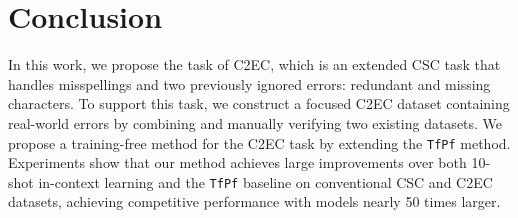 \section{Conclusion}
In this work, we propose the task of C2EC, which is an extended CSC task that handles misspellings and two previously ignored errors: redundant and missing characters.
To support this task, we construct a focused C2EC dataset containing real-world errors by combining and manually verifying two existing datasets.
We propose a training-free method for the C2EC task by extending the \texttt{TfPf} method.
Experiments show that our method achieves large improvements over both 10-shot in-context learning and the \texttt{TfPf} baseline on conventional CSC and C2EC datasets, achieving competitive performance with models nearly 50 times larger.
